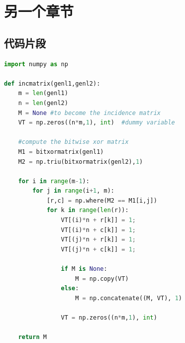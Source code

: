 
\chapter{另一个章节}

\section{代码片段}

\begin{lstlisting}[language=Python, caption={Python Code}, label={lst:pythonfile}]
import numpy as np

def incmatrix(genl1,genl2):
    m = len(genl1)
    n = len(genl2)
    M = None #to become the incidence matrix
    VT = np.zeros((n*m,1), int)  #dummy variable

    #compute the bitwise xor matrix
    M1 = bitxormatrix(genl1)
    M2 = np.triu(bitxormatrix(genl2),1)

    for i in range(m-1):
        for j in range(i+1, m):
            [r,c] = np.where(M2 == M1[i,j])
            for k in range(len(r)):
                VT[(i)*n + r[k]] = 1;
                VT[(i)*n + c[k]] = 1;
                VT[(j)*n + r[k]] = 1;
                VT[(j)*n + c[k]] = 1;

                if M is None:
                    M = np.copy(VT)
                else:
                    M = np.concatenate((M, VT), 1)

                VT = np.zeros((n*m,1), int)

    return M
\end{lstlisting}
